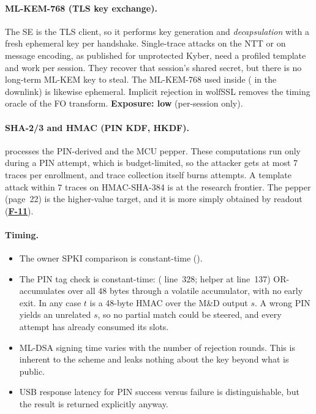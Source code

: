 \documentclass[11pt,a4paper]{article}
\newcommand{\fid}[1]{\textbf{#1}}
\begin{document}
\paragraph{ML-KEM-768 (TLS key exchange).} The SE is the TLS client, so it performs key generation and \emph{decapsulation} with a fresh ephemeral key per handshake. Single-trace attacks on the NTT or on message encoding, as published for unprotected Kyber, need a profiled template and work per session. They recover that session's shared secret, but there is no long-term ML-KEM key to steal. The ML-KEM-768 used inside  ( in the downlink) is likewise ephemeral. Implicit rejection in wolfSSL removes the timing oracle of the FO transform. \textbf{Exposure: low} (per-session only).

\paragraph{SHA-2/3 and HMAC (PIN KDF, HKDF).}  processes the PIN-derived  and the MCU pepper. These computations run only during a PIN attempt, which is budget-limited, so the attacker gets at most 7 traces per enrollment, and trace collection itself burns attempts. A template attack within 7 traces on HMAC-SHA-384 is at the research frontier. The pepper (page~22) is the higher-value target, and it is more simply obtained by readout (\hyperref[f:F-11]{\fid{F-11}}).

\paragraph{Timing.}
\begin{itemize}
\item The owner SPKI comparison is constant-time ().
\item The PIN tag check is constant-time:  ( line~328; helper at line~137) OR-accumulates over all 48 bytes through a volatile accumulator, with no early exit. In any case $t$ is a 48-byte HMAC over the M\&D output $s$. A wrong PIN yields an unrelated $s$, so no partial match could be steered, and every attempt has already consumed its slots.
\item ML-DSA signing time varies with the number of rejection rounds. This is inherent to the scheme and leaks nothing about the key beyond what is public.
\item USB response latency for PIN success versus failure is distinguishable, but the result is returned explicitly anyway.
\end{itemize}
\end{document}
